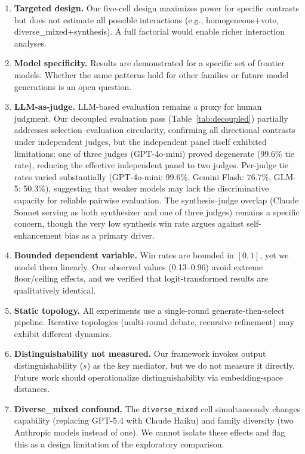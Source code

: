 \documentclass[10pt,twocolumn]{article}
\theoremstyle{remark}
\begin{document}
\begin{enumerate}[nosep]
  \item \textbf{Targeted design.} Our five-cell design maximizes power for specific contrasts but does not estimate all possible interactions (e.g., homogeneous+vote, diverse\_mixed+synthesis). A full factorial would enable richer interaction analyses.

  \item \textbf{Model specificity.} Results are demonstrated for a specific set of frontier models. Whether the same patterns hold for other families or future model generations is an open question.

  \item \textbf{LLM-as-judge.} LLM-based evaluation remains a proxy for human judgment. Our decoupled evaluation pass (Table~\ref{tab:decoupled}) partially addresses selection--evaluation circularity, confirming all directional contrasts under independent judges, but the independent panel itself exhibited limitations: one of three judges (GPT-4o-mini) proved degenerate (99.6\% tie rate), reducing the effective independent panel to two judges. Per-judge tie rates varied substantially (GPT-4o-mini: 99.6\%, Gemini Flash: 76.7\%, GLM-5: 50.3\%), suggesting that weaker models may lack the discriminative capacity for reliable pairwise evaluation. The synthesis--judge overlap (Claude Sonnet serving as both synthesizer and one of three judges) remains a specific concern, though the very low synthesis win rate argues against self-enhancement bias as a primary driver.

  \item \textbf{Bounded dependent variable.} Win rates are bounded in $[0, 1]$, yet we model them linearly. Our observed values (0.13--0.96) avoid extreme floor/ceiling effects, and we verified that logit-transformed results are qualitatively identical.

  \item \textbf{Static topology.} All experiments use a single-round generate-then-select pipeline. Iterative topologies (multi-round debate, recursive refinement) may exhibit different dynamics.

  \item \textbf{Distinguishability not measured.} Our framework invokes output distinguishability ($s$) as the key mediator, but we do not measure it directly. Future work should operationalize distinguishability via embedding-space distances.

  \item \textbf{Diverse\_mixed confound.} The \texttt{diverse\_mixed} cell simultaneously changes capability (replacing GPT-5.4 with Claude Haiku) and family diversity (two Anthropic models instead of one). We cannot isolate these effects and flag this as a design limitation of the exploratory comparison.
\end{enumerate}
\end{document}

